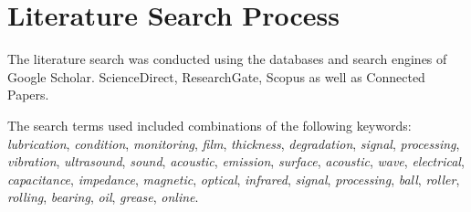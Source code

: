 
\section{Literature Search Process}

The literature search was conducted using the databases and search engines of Google Scholar. ScienceDirect, ResearchGate, Scopus as well as Connected Papers.

The search terms used included combinations of the following keywords: \textit{lubrication}, \textit{condition}, \textit{monitoring}, \textit{film}, \textit{thickness}, \textit{degradation}, \textit{signal}, \textit{processing}, \textit{vibration}, \textit{ultrasound}, \textit{sound}, \textit{acoustic}, \textit{emission}, \textit{surface}, \textit{acoustic}, \textit{wave}, \textit{electrical}, \textit{capacitance}, \textit{impedance}, \textit{magnetic}, \textit{optical}, \textit{infrared}, \textit{signal}, \textit{processing}, \textit{ball}, \textit{roller}, \textit{rolling}, \textit{bearing}, \textit{oil}, \textit{grease}, \textit{online}.